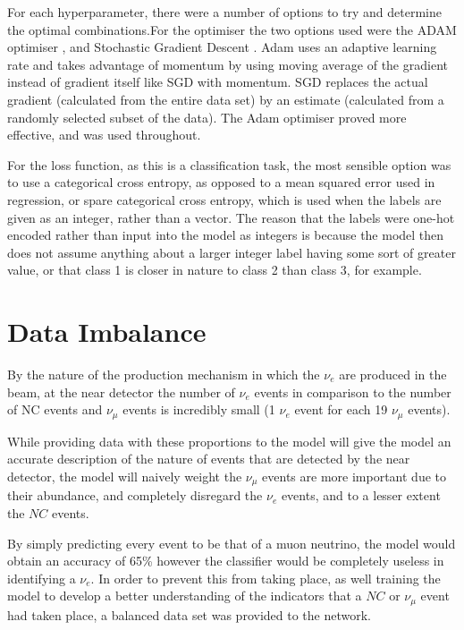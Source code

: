 \noindent For each hyperparameter, there were a number of options to try and determine the optimal combinations.For the optimiser the two options used were the ADAM optimiser \cite{Kingma}, and Stochastic Gradient Descent \cite{Guo}. Adam uses an adaptive learning rate and takes advantage of momentum by using moving average of the gradient instead of gradient itself like SGD with momentum. SGD replaces the actual gradient (calculated from the entire data set) by an estimate (calculated from a randomly selected subset of the data). The Adam optimiser proved more effective, and was used throughout. \medskip

\noindent For the loss function, as this is a classification task, the most sensible option was to use a categorical cross entropy, as opposed to a mean squared error used in regression, or spare categorical cross entropy, which is used when the labels are given as an integer, rather than a vector. The reason that the labels were one-hot encoded rather than input into the model as integers is because the model then does not assume anything about a larger integer label having some sort of greater value, or that class 1 is closer in nature to class 2 than class 3, for example. \medskip

\section{Data Imbalance}

\noindent By the nature of the production mechanism in which the $\nu_e$ are produced in the beam, at the near detector the number of $\nu_e$ events in comparison to the number of NC events and $\nu_\mu$ events is incredibly small (1 $\nu_e$ event for each 19 $\nu_\mu$ events).\medskip

\noindent While providing data with these proportions to the model will give the model an accurate description of the nature of events that are detected by the near detector, the model will naively weight the $\nu_\mu$  events are more important due to their abundance, and completely disregard the $\nu_e$  events, and to a lesser extent the $NC$ events. \medskip

\noindent By simply predicting every event to be that of a muon neutrino, the model would obtain an accuracy of 65\% however the classifier would be completely useless in identifying a $\nu_e$. In order to prevent this from taking place, as well training the model to develop a better understanding of the indicators that a $NC$ or $\nu_\mu$ event had taken place, a balanced data set was provided to the network.\medskip

